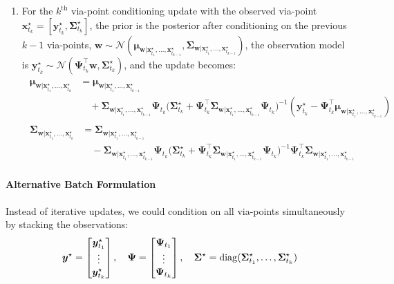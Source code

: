 \documentclass{article}
\begin{document}
\begin{enumerate}
\item For the $k^{\text{th}}$ via-point conditioning update with the observed via-point $\bm{x}_{t_{k}}^\star = [\bm{y}_{t_{k}}^\star, \bm{\Sigma}^\star_{t_{k}}]$, the prior is the posterior after conditioning on the previous $k-1$ via-points, \ie{} $\bm{w} \sim \mathcal{N}(\bm{\mu}_{\bm{w}|\bm{x}_{t_{1}}^\star, \dots, \bm{x}_{t_{k-1}}^\star}, \bm{\Sigma}_{\bm{w}|\bm{x}_{t_{1}}^\star, \dots, \bm{x}_{t_{k-1}}^\star})$, the observation model is $\bm{y}_{t_{k}}^\star \sim \mathcal{N}(\bm{\Psi}_{t_k}^\top \bm{w}, \bm{\Sigma}_{t_{k}}^\star)$, and the update becomes:
\begin{align}
\begin{split}
\bm{\mu}_{\bm{w}|\bm{x}_{t_{1}}^\star, \dots, \bm{x}_{t_{k}}^\star} &= \bm{\mu}_{\bm{w}|\bm{x}_{t_{1}}^\star, \dots, \bm{x}_{t_{k-1}}^\star} \\&\quad+ \bm{\Sigma}_{\bm{w}|\bm{x}_{t_{1}}^\star, \dots, \bm{x}_{t_{k-1}}^\star}\bm{\Psi}_{t_k} \Big(\bm{\Sigma}_{t_{k}}^\star + \bm{\Psi}_{t_k}^\top \bm{\Sigma}_{\bm{w}|\bm{x}_{t_{1}}^\star, \dots, \bm{x}_{t_{k-1}}^\star}\bm{\Psi}_{t_k} \Big)^{-1} (\bm{y}_{t_{k}}^\star - \bm{\Psi}_{t_k}^\top \bm{\mu}_{\bm{w}|\bm{x}_{t_{1}}^\star, \dots, \bm{x}_{t_{k-1}}^\star})
\end{split}\\
\begin{split}
\bm{\Sigma}_{\bm{w}|\bm{x}_{t_{1}}^\star, \dots, \bm{x}_{t_{k}}^\star} &= \bm{\Sigma}_{\bm{w}|\bm{x}_{t_{1}}^\star, \dots, \bm{x}_{t_{k-1}}^\star} \\&\quad- \bm{\Sigma}_{\bm{w}|\bm{x}_{t_{1}}^\star, \dots, \bm{x}_{t_{k-1}}^\star}\bm{\Psi}_{t_k} \Big(\bm{\Sigma}_{t_{k}}^\star +  \bm{\Psi}_{t_k}^\top \bm{\Sigma}_{\bm{w}|\bm{x}_{t_{1}}^\star, \dots, \bm{x}_{t_{k-1}}^\star}\bm{\Psi}_{t_k} \Big)^{-1} \bm{\Psi}_{t_k}^\top \bm{\Sigma}_{\bm{w}|\bm{x}_{t_{1}}^\star, \dots, \bm{x}_{t_{k-1}}^\star}
\end{split}
\end{align}
\end{enumerate}

\paragraph{Alternative Batch Formulation}
Instead of iterative updates, we could condition on all via-points simultaneously by stacking the observations:
\begin{equation}
  \bm{y}^{\star} =
  \begin{bmatrix}
    \bm{y}^{\star}_{t_{1}}\\
    \vdots \\
    \bm{y}^{\star}_{t_{k}}
  \end{bmatrix}, \quad
  \bm{\Psi} =
  \begin{bmatrix}
    \bm{\Psi}_{t_{1}}\\
    \vdots \\
    \bm{\Psi}_{t_{k}}
  \end{bmatrix}, \quad
  \bm{\Sigma}^\star = \operatorname{diag}(\bm{\Sigma}^\star_{t_{1}}, \dots, \bm{\Sigma}^\star_{t_{k}})
\end{equation}
\end{document}
